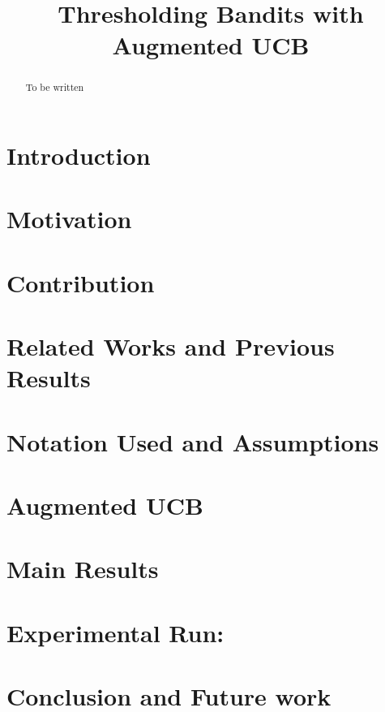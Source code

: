 \documentclass[fleqn,anon,12pt]{colt2016} %
\title[Thresholding Bandits with Augmented UCB]{Thresholding Bandits with Augmented UCB}
\begin{document}
\maketitle

\begin{abstract}
To be written
\end{abstract}


\section{Introduction}
\label{intro}


\section{Motivation}
\label{motivation}



\section{Contribution}
\label{contribution}


\section{Related Works and Previous Results}
\label{prevRes}


\section{Notation Used and Assumptions}
\label{notation}


\section{Augmented UCB}
\label{algo}


\section{Main Results}
\label{results}
%


\section{Experimental Run:}
\label{expt}



\section{Conclusion and Future work}
\label{conclusion}










%
\end{document}
